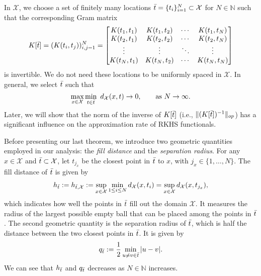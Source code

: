 \documentclass{article}
\def\NN{\mathbb N}
\numberwithin{equation}{section}
\begin{document}
In $\mathcal{X}$, we choose a set of finitely many locations $\Bar{t}=\{t_i\}_{i=1}^N \subset \mathcal{X}$ for $N\in\NN$ such that the corresponding Gram matrix \begin{equation}\label{gram}
    K[\Bar{t} ] = (K(t_i, t_j))_{i,j=1}^N 
    =  \begin{bmatrix}
    K(t_1, t_1) & K(t_1, t_2) & \cdots & K(t_1, t_N)\\
    K(t_2, t_1) & K(t_2, t_2) & \cdots & K(t_2, t_N)\\
    \vdots & \vdots & \ddots & \vdots\\
    K(t_N, t_1) & K(t_N, t_2) & \cdots & K(t_N, t_N)
      \end{bmatrix}
\end{equation} is invertible. We do not need these locations to be uniformly spaced in $\mathcal{X}$. 
In general, we select $\Bar{t}$  such that
\begin{equation*}
    \max_{x\in \mathcal{X}} \min_{t\in \Bar{t}} \ d_\mathcal{X}(x,t) \rightarrow 0, \qquad \text{as } N \rightarrow \infty.
\end{equation*}
Later, we will show that the norm of the inverse of $K[\Bar{t} ]$ (i.e., $\|(K[\Bar{t}])^{-1 }\|_{op}$) has a significant influence on the approximation rate of RKHS functionals. 

Before presenting our last theorem, we introduce two geometric quantities employed in our analysis: the {\it fill distance} and the {\it separation radius}.  
For any $x\in \mathcal{X}$ and $\Bar{t} \subset \mathcal{X}$, let $t_{j_x}$ be the closest point in $\Bar{t}$ to $x$, with $j_x \in \{1,\ldots, N\}$. The fill distance of $\Bar{t}$  is given by 
\begin{eqnarray}\label{fill}
    h_{\Bar{t}} := h_{\Bar{t},\mathcal{X}} := \sup_{x\in \mathcal{X}} \min_{1\leq i \leq N}d_\mathcal{X}(x, t_i) = \sup_{x\in \mathcal{X}} d_\mathcal{X}(x,t_{j_x}) , 
\end{eqnarray}
which indicates how well the points in $\Bar{t}$ fill out the domain $\mathcal{X}$. 
It measures the radius of the largest possible empty ball that can be placed among the points in $\Bar{t}$. 
The second geometric quantity is the separation radius of $\Bar{t}$, which is half
the distance between the two closest points in $\Bar{t}$. It is given by 
\begin{equation}\label{separation}
    q_{\Bar{t}} := \frac{1}{2} \min_{u \neq v \in\bar{t}} |u-v|.
\end{equation}
We can see that $h_{\Bar{t}}$ and $q_{\Bar{t}}$ decreases as  $N\in \NN$ increases.
\end{document}
